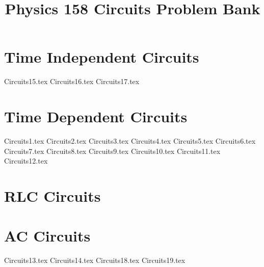\documentclass[11pt, fleqn]{article}
\title{Physics 158 Circuits Problem Bank}
\author{}
\date{}
\begin{document}
\allowdisplaybreaks

\maketitle

\section*{Time Independent Circuits}
{Circuits15.tex}
{Circuits16.tex}
{Circuits17.tex}

\section*{Time Dependent Circuits}
{Circuits1.tex}
{Circuits2.tex}
{Circuits3.tex}
{Circuits4.tex}
{Circuits5.tex}
{Circuits6.tex}
{Circuits7.tex}
{Circuits8.tex}
{Circuits9.tex}
{Circuits10.tex}
{Circuits11.tex}
{Circuits12.tex}

\section*{RLC Circuits}

\section*{AC Circuits}
{Circuits13.tex}
{Circuits14.tex}
{Circuits18.tex}
{Circuits19.tex}
\end{document}
